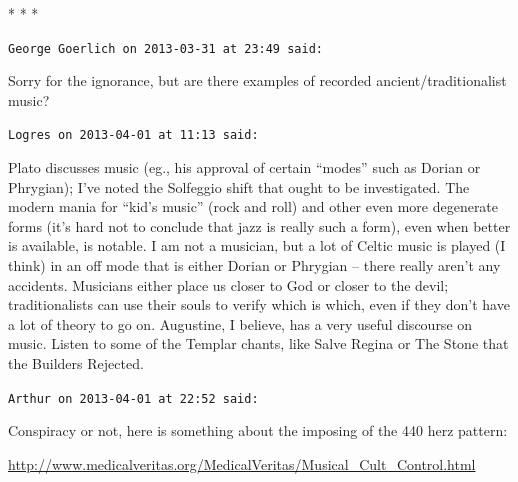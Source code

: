 
\begin{center}* * *\end{center}

\begin{footnotesize}
\begin{sffamily}
\texttt{George Goerlich on 2013-03-31 at 23:49 said:}

Sorry for the ignorance, but are there examples of recorded ancient/traditionalist music?

\hfill

\texttt{Logres on 2013-04-01 at 11:13 said:}

Plato discusses music (eg., his approval of certain ``modes'' such as Dorian or Phrygian); I've noted the Solfeggio shift that ought to be investigated. The modern mania for ``kid's music'' (rock and roll) and other even more degenerate forms (it's hard not to conclude that jazz is really such a form), even when better is available, is notable. I am not a musician, but a lot of Celtic music is played (I think) in an off mode that is either Dorian or Phrygian -- there really aren't any accidents. Musicians either place us closer to God or closer to the devil; traditionalists can use their souls to verify which is which, even if they don't have a lot of theory to go on. Augustine, I believe, has a very useful discourse on music. Listen to some of the Templar chants, like Salve Regina or The Stone that the Builders Rejected.

\hfill

\texttt{Arthur on 2013-04-01 at 22:52 said:}

Conspiracy or not, here is something about the imposing of the 440 herz pattern:

\url{http://www.medicalveritas.org/MedicalVeritas/Musical_Cult_Control.html}


\end{sffamily}
\end{footnotesize}

